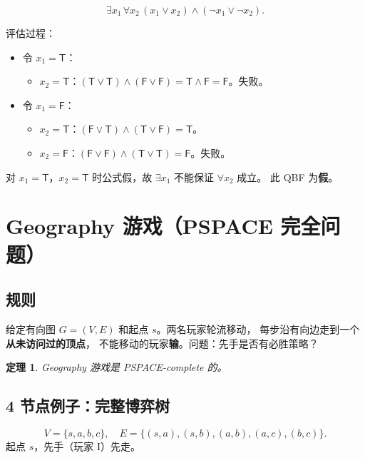 \documentclass[UTF8,openany,12pt]{ctexbook}
\newtheorem{theorem}{定理}[chapter]
\theoremstyle{remark}
\begin{document}
\[
  \exists x_1\, \forall x_2\, (x_1 \vee x_2) \wedge (\neg x_1 \vee \neg x_2).
\]

评估过程：
\begin{itemize}
  \item 令 $x_1 = \mathsf{T}$：
    \begin{itemize}
      \item $x_2 = \mathsf{T}$：$(\mathsf{T} \vee \mathsf{T}) \wedge (\mathsf{F} \vee \mathsf{F}) = \mathsf{T} \wedge \mathsf{F} = \mathsf{F}$。失败。
    \end{itemize}
  \item 令 $x_1 = \mathsf{F}$：
    \begin{itemize}
      \item $x_2 = \mathsf{T}$：$(\mathsf{F} \vee \mathsf{T}) \wedge (\mathsf{T} \vee \mathsf{F}) = \mathsf{T}$。
      \item $x_2 = \mathsf{F}$：$(\mathsf{F} \vee \mathsf{F}) \wedge (\mathsf{T} \vee \mathsf{T}) = \mathsf{F}$。失败。
    \end{itemize}
\end{itemize}

对 $x_1 = \mathsf{T}$，$x_2 = \mathsf{T}$ 时公式假，故 $\exists x_1$ 不能保证 $\forall x_2$ 成立。
此 QBF 为\textbf{假}。

\section{Geography 游戏（PSPACE 完全问题）}

\subsection{规则}

给定有向图 $G=(V,E)$ 和起点 $s$。两名玩家轮流移动，
每步沿有向边走到一个\textbf{从未访问过的顶点}，
不能移动的玩家\textbf{输}。问题：先手是否有必胜策略？

\begin{theorem}
Geography 游戏是 PSPACE-complete 的。
\end{theorem}

\subsection{4 节点例子：完整博弈树}

\[
  V = \{s, a, b, c\},\quad
  E = \{(s,a),(s,b),(a,b),(a,c),(b,c)\}.
\]
起点 $s$，先手（玩家 I）先走。
\end{document}
